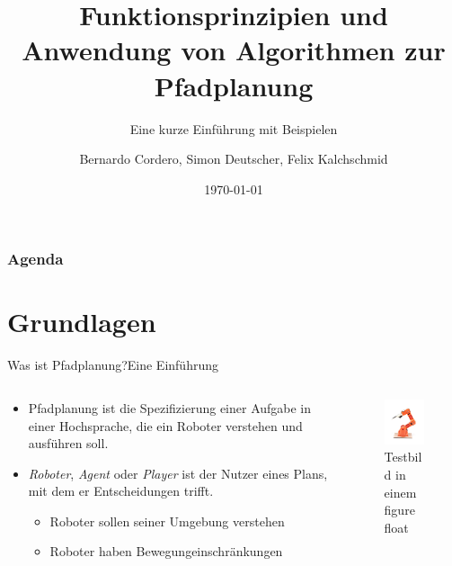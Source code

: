 \documentclass[t,aspectratio=169,dvipsnames]{beamer}
\title{Funktionsprinzipien und Anwendung von Algorithmen zur Pfadplanung}
\subtitle{Eine kurze Einführung mit Beispielen}
\author{Bernardo Cordero, Simon Deutscher, Felix Kalchschmid}							%
\institute{Hochschule Trier}
\date{\today}
\begin{document}
\begin{frame}
\titlepage
\end{frame}

\begin{frame}
\frametitle{Agenda}
\tableofcontents
\end{frame}

\section{Grundlagen}

\begin{frame}{Was ist Pfadplanung?}{Eine Einführung}
	\begin{columns}[T]
		\begin{column}[T]{0.6\textwidth}
		\begin{itemize}
		\item Pfadplanung ist die Spezifizierung einer Aufgabe in einer Hochsprache, die ein Roboter verstehen und ausführen soll.
		\newline\newline
		\item \textit{Roboter}, \textit{Agent} oder \textit{Player} ist der Nutzer eines Plans, mit dem er Entscheidungen trifft.
	
		\begin{itemize}
		\item Roboter sollen seiner Umgebung verstehen
		\item Roboter haben Bewegungeinschränkungen
		\end{itemize}
		\end{itemize}
		\end{column}
		\begin{column}[T]{0.4\textwidth}
			\begin{figure}
			\includegraphics[width=2.5cm]{images/Bild1.png}
			\caption{Testbild in einem figure float}
		\end{figure}
		\end{column}
	\end{columns}
\end{frame}
\end{document}

